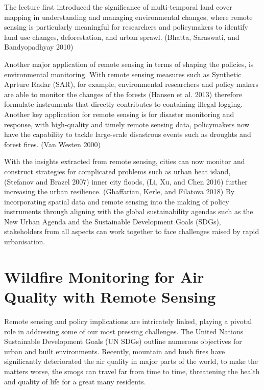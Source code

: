 \documentclass[
  letterpaper,
  DIV=11,
  numbers=noendperiod]{scrreprt}
\begin{document}

The lecture first introduced the significance of multi-temporal land
cover mapping in understanding and managing environmental changes, where
remote sensing is particularly meaningful for researchers and
policymakers to identify land use changes, deforestation, and urban
sprawl. (Bhatta, Saraswati, and Bandyopadhyay 2010)

Another major application of remote sensing in terms of shaping the
policies, is environmental monitoring. With remote sensing measures such
as Synthetic Aprture Radar (SAR), for example, environmental researchers
and policy makers are able to monitor the changes of the forests (Hansen
et al. 2013) therefore formulate instruments that directly contributes
to containing illegal logging. Another key application for remote
sensing is for disaster monitoring and response, with high-quality and
timely remote sensing data, policymakers now have the capability to
tackle large-scale disastrous events such as droughts and forest fires.
(Van Westen 2000)

With the insights extracted from remote sensing, cities can now monitor
and construct strategies for complicated problems such as urban heat
island, (Stefanov and Brazel 2007) inner city floods, (Li, Xu, and Chen
2016) further increasing the urban resilience. (Ghaffarian, Kerle, and
Filatova 2018) By incorporating spatial data and remote sensing into the
making of policy instruments through aligning with the global
sustainability agendas such as the New Urban Agenda and the Sustainable
Development Goals (SDGs), stakeholders from all aspects can work
together to face challenges raised by rapid urbanisation.

\hypertarget{wildfire-monitoring-for-air-quality-with-remote-sensing}{%
\section*{Wildfire Monitoring for Air Quality with Remote
Sensing}\label{wildfire-monitoring-for-air-quality-with-remote-sensing}}


Remote sensing and policy implications are intricately linked, playing a
pivotal role in addressing some of our most pressing challenges. The
United Nations Sustainable Development Goals (UN SDGs) outline numerous
objectives for urban and built environments. Recently, mountain and bush
fires have significantly deteriorated the air quality in major parts of
the world, to make the matters worse, the smogs can travel far from time
to time, threatening the health and quality of life for a great many
residents.
\end{document}
